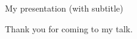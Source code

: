 
\let\header\big
\let\subheader\large

\newslide

\topfill
{\center %
    \header My presentation
    \subheader (with subtitle)}

\newslide

\topfill
{\center %
    Thank you for coming to my talk.
}

\bye
